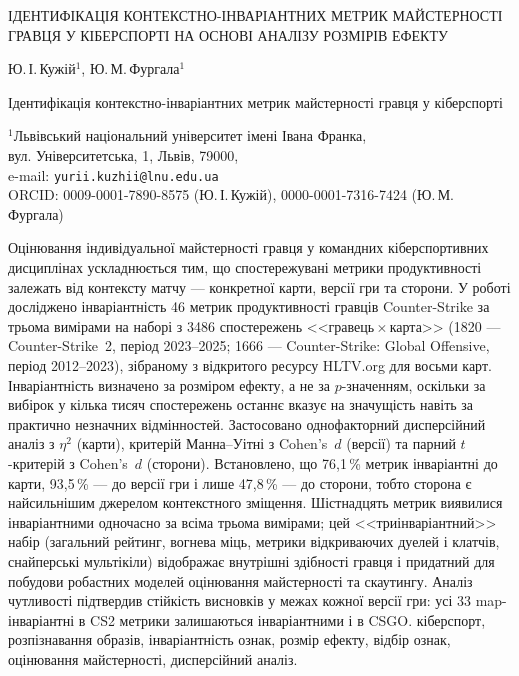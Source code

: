 
\begin{Title}
ІДЕНТИФІКАЦІЯ КОНТЕКСТНО-ІНВАРІАНТНИХ МЕТРИК МАЙСТЕРНОСТІ ГРАВЦЯ
У КІБЕРСПОРТІ НА ОСНОВІ АНАЛІЗУ РОЗМІРІВ ЕФЕКТУ
\end{Title}

\begin{Authors}
Ю.\,І.\,Кужій$^{1}$, Ю.\,М.\,Фургала$^{1}$
\end{Authors}

{Ідентифікація контекстно-інваріантних метрик майстерності гравця у кіберспорті}

\begin{Organization}
$^{1}$Львівський національний університет імені Івана Франка,\\
вул. Університетська, 1, Львів, 79000,\\
e-mail: \texttt{yurii.kuzhii@lnu.edu.ua}\\
ORCID: 0009-0001-7890-8575 (Ю.\,І.\,Кужій), 0000-0001-7316-7424 (Ю.\,М.\,Фургала)
\end{Organization}

\begin{Abstract}
Оцінювання індивідуальної майстерності гравця у командних кіберспортивних дисциплінах
ускладнюється тим, що спостережувані метрики продуктивності залежать від контексту матчу ---
конкретної карти, версії гри та сторони. У роботі досліджено інваріантність 46 метрик
продуктивності гравців Counter-Strike за трьома вимірами на наборі з 3486 спостережень
<<гравець\,$\times$\,карта>> (1820 --- Counter-Strike~2, період 2023--2025; 1666 ---
Counter-Strike: Global Offensive, період 2012--2023), зібраному з відкритого ресурсу HLTV.org
для восьми карт. Інваріантність визначено за розміром ефекту, а не за $p$-значенням, оскільки
за вибірок у кілька тисяч спостережень останнє вказує на значущість навіть за практично
незначних відмінностей. Застосовано однофакторний дисперсійний аналіз з $\eta^2$ (карти),
критерій Манна--Уітні з Cohen's~$d$ (версії) та парний $t$-критерій з Cohen's~$d$ (сторони).
Встановлено, що 76,1\,\% метрик інваріантні до карти, 93,5\,\% --- до версії гри і лише
47,8\,\% --- до сторони, тобто сторона є найсильнішим джерелом контекстного зміщення.
Шістнадцять метрик виявилися інваріантними одночасно за всіма трьома вимірами; цей
<<триінваріантний>> набір (загальний рейтинг, вогнева міць, метрики відкриваючих дуелей і
клатчів, снайперські мультікіли) відображає внутрішні здібності гравця і придатний для побудови
робастних моделей оцінювання майстерності та скаутингу. Аналіз чутливості підтвердив стійкість
висновків у межах кожної версії гри: усі 33 map-інваріантні в CS2 метрики залишаються
інваріантними і в CSGO.
\KeywordsUkr
кіберспорт, розпізнавання образів, інваріантність ознак, розмір ефекту, відбір ознак,
оцінювання майстерності, дисперсійний аналіз.
\end{Abstract}


